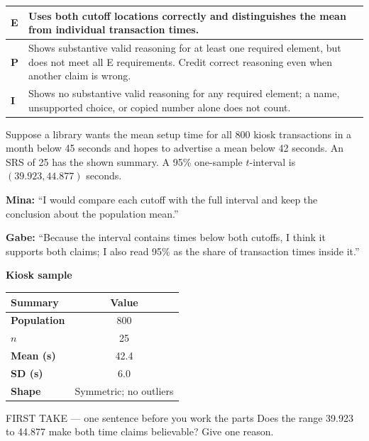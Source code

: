 \documentclass[11pt]{article}
\begin{document}
{\small\renewcommand{\arraystretch}{1.25}
\noindent\begin{tabular}{|p{0.5in}|p{5.9in}|}
\hline
\textbf{E} & Uses both cutoff locations correctly and distinguishes the mean from individual transaction times. \\ \hline
\textbf{P} & Shows substantive valid reasoning for at least one required element, but does not meet all E requirements. Credit correct reasoning even when another claim is wrong. \\ \hline
\textbf{I} & Shows no substantive valid reasoning for any required element; a name, unsupported choice, or copied number alone does not count. \\ \hline
\end{tabular}}

\clearpage
{}

Suppose a library wants the mean setup time for all 800 kiosk transactions in a month below 45 seconds and hopes to advertise a mean below 42 seconds. An SRS of 25 has the shown summary. A 95\% one-sample $t$-interval is $(39.923,44.877)$ seconds.\par\smallskip \textbf{Mina:} ``I would compare each cutoff with the full interval and keep the conclusion about the population mean.''\par \textbf{Gabe:} ``Because the interval contains times below both cutoffs, I think it supports both claims; I also read 95\% as the share of transaction times inside it.''\par
\begin{center}
\textbf{Kiosk sample}\par\smallskip
\begin{tabular}{|l|c|}
\hline
\textbf{Summary} & \textbf{Value} \\ \hline
\textbf{Population} & 800 \\ \hline
\textbf{$n$} & 25 \\ \hline
\textbf{Mean (s)} & 42.4 \\ \hline
\textbf{SD (s)} & 6.0 \\ \hline
\textbf{Shape} & Symmetric; no outliers \\ \hline
\end{tabular}
\end{center}
\begin{firsttakebox}{FIRST TAKE --- one sentence before you work the parts}
Does the range 39.923 to 44.877 make both time claims believable? Give one reason.\par
{}
\end{firsttakebox}
\end{document}
